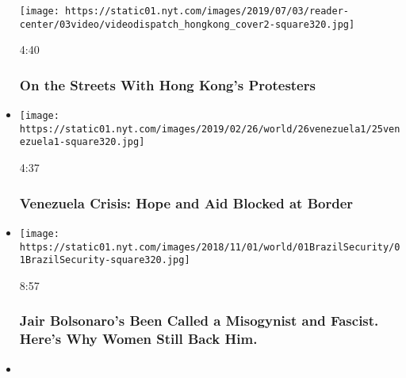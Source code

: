 \begin{itemize}
  \texttt{[image: https://static01.nyt.com/images/2019/07/03/reader-center/03video/videodispatch\_hongkong\_cover2-square320.jpg]}

  4:40

  \hypertarget{on-the-streets-with-hong-kongs-protesters}{%
  \subsubsection{On the Streets With Hong Kong's
  Protesters}\label{on-the-streets-with-hong-kongs-protesters}}
\item
  \href{https://www.nytimes.com/video/world/americas/100000006332149/hope-thwarted-along-with-aid-at-venezuelas-border.html?action=click\&module=video-series-bar\&region=header\&pgtype=Article\&playlistId=video/on-the-ground}{}

  \texttt{[image: https://static01.nyt.com/images/2019/02/26/world/26venezuela1/25venezuela1-square320.jpg]}

  4:37

  \hypertarget{venezuela-crisis-hope-and-aid-blocked-at-border}{%
  \subsubsection{Venezuela Crisis: Hope and Aid Blocked at
  Border}\label{venezuela-crisis-hope-and-aid-blocked-at-border}}
\item
  \href{https://www.nytimes.com/video/world/americas/100000006128670/hes-been-called-a-misogynist-and-a-fascist-many-women-still-back-him.html?action=click\&module=video-series-bar\&region=header\&pgtype=Article\&playlistId=video/on-the-ground}{}

  \texttt{[image: https://static01.nyt.com/images/2018/11/01/world/01BrazilSecurity/01BrazilSecurity-square320.jpg]}

  8:57

  \hypertarget{jair-bolsonaros-been-called-a-misogynist-and-fascist-heres-why-women-still-back-him}{%
  \subsubsection{Jair Bolsonaro's Been Called a Misogynist and Fascist.
  Here's Why Women Still Back
  Him.}\label{jair-bolsonaros-been-called-a-misogynist-and-fascist-heres-why-women-still-back-him}}
\item
  \href{https://www.nytimes.com/video/world/100000007141490/-india-police-pandemic-coronavirus.html?action=click\&module=video-series-bar\&region=header\&pgtype=Article\&playlistId=video/on-the-ground}{}


\end{itemize}

